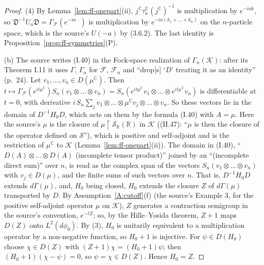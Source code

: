\documentclass[11pt,a4paper]{article}
\theoremstyle{plain}
\theoremstyle{definition}
\theoremstyle{plain}
\theoremstyle{definition}
\newcommand{\R}{\mathbb{R}}
\newcommand{\C}{\mathbb{C}}
\begin{document}
\begin{proof}
(4) By Lemma~\ref{lem:ff-onepart}(ii), $j^{\C}\tau_a^{\C}(j^{\C})^{-1}$ is multiplication by
$e^{-iak}$, so $\mathfrak D^{-1}U_a\mathfrak D=\Gamma_{\!\mathcal F}(e^{-ia\,\cdot})$ is
multiplication by $e^{-ia(k_1+\dots+k_n)}$ on the $n$-particle space, which is the source's
$U(-a)$ by (3.6.2).  The last identity is Proposition~\ref{prop:ff-symmetries}(P).

(b) The source writes (I.40) in the Fock-space realization of $\Gamma_n(\mathcal K)$: after its
Theorem I.11 it uses $\Gamma$, $\Gamma_n$ for $\mathcal F$, $\mathcal F_n$ and ``drop[s] `$D$'
treating it as an identity'' (p.~24).  Let $v_1,\dots,v_n\in D(\mu^{\C})$.  Then
$t\mapsto\Gamma_{\!\mathcal F}(e^{it\mu^{\C}})S_n(v_1\otimes\dots\otimes v_n)=
S_n(e^{it\mu^{\C}}v_1\otimes\dots\otimes e^{it\mu^{\C}}v_n)$ is differentiable at $t=0$, with
derivative $i\,S_n\sum_jv_1\otimes\dots\otimes\mu^{\C}v_j\otimes\dots\otimes v_n$.  So these
vectors lie in the domain of $D^{-1}H_0D$, which acts on them by the formula (I.40) with
$A=\mu$.  Here the source's $\mu$ is the closure of $\mu\upharpoonright\mathcal S_\R(\R)$ in
$\mathcal K$ ((II.47): ``$\mu$ is then the closure of the operator defined on $\mathcal S$''),
which is positive and self-adjoint and is the restriction of $\mu^{\C}$ to $\mathcal K$
(Lemma~\ref{lem:ff-onepart}(ii)).  The domain in (I.40), ``$D(A)\otimes\dots\otimes D(A)$
(incomplete tensor product)'' joined by an ``(incomplete direct sum)'' over $n$, is read as the
complex span of the vectors $S_n(v_1\otimes\dots\otimes v_n)$ with $v_j\in D(\mu)$, and the
finite sums of such vectors over $n$.  That is, $D^{-1}H_0D$ extends $d\Gamma(\mu)$, and, $H_0$ being closed, $H_0$ extends
the closure $Z$ of $d\Gamma(\mu)$ transported by $D$.  By Assumption~\ref{A:cutoff}(f) (the
source's Example 3, for the positive self-adjoint operator $\mu$ on $\mathcal K$), $Z$
generates a contraction semigroup in the source's convention, $e^{-tZ}$; so, by the
Hille--Yosida theorem, $Z+1$ maps $D(Z)$ onto $L^2(d\phi_0)$.  By (3), $H_0$ is
unitarily equivalent to a multiplication operator by a non-negative function, so $H_0+1$ is
injective.  For $\psi\in D(H_0)$ choose $\chi\in D(Z)$ with $(Z+1)\chi=(H_0+1)\psi$; then
$(H_0+1)(\chi-\psi)=0$, so $\psi=\chi\in D(Z)$.  Hence $H_0=Z$.
\end{proof}
\end{document}
